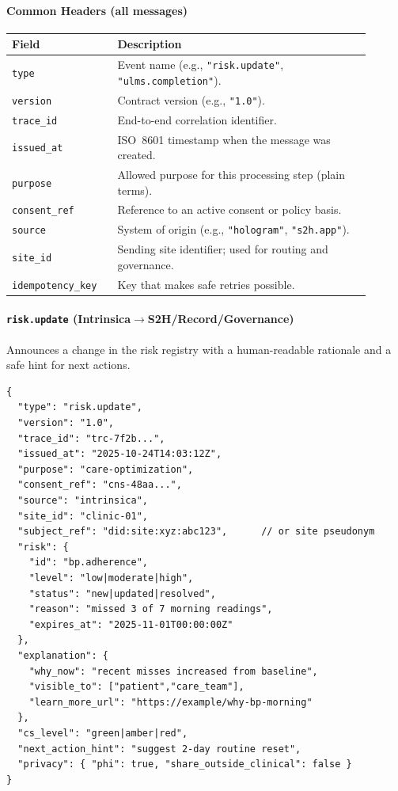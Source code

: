 \documentclass[12pt]{article}
\begin{document}
\paragraph{Common Headers (all messages)}
\begin{longtable}{@{}p{0.26\linewidth}p{0.64\linewidth}@{}}
\toprule
\textbf{Field} & \textbf{Description} \\
\midrule
\endhead
\texttt{type} & Event name (e.g., \texttt{"risk.update"}, \texttt{"ulms.completion"}). \\
\texttt{version} & Contract version (e.g., \texttt{"1.0"}). \\
\texttt{trace\_id} & End-to-end correlation identifier. \\
\texttt{issued\_at} & ISO~8601 timestamp when the message was created. \\
\texttt{purpose} & Allowed purpose for this processing step (plain terms). \\
\texttt{consent\_ref} & Reference to an active consent or policy basis. \\
\texttt{source} & System of origin (e.g., \texttt{"hologram"}, \texttt{"s2h.app"}). \\
\texttt{site\_id} & Sending site identifier; used for routing and governance. \\
\texttt{idempotency\_key} & Key that makes safe retries possible. \\
\bottomrule
\end{longtable}

\paragraph{\texttt{risk.update} (Intrinsica$\rightarrow$S2H/Record/Governance)}
Announces a change in the risk registry with a human-readable rationale and a safe hint for next actions.

\begin{verbatim}
{
  "type": "risk.update",
  "version": "1.0",
  "trace_id": "trc-7f2b...",
  "issued_at": "2025-10-24T14:03:12Z",
  "purpose": "care-optimization",
  "consent_ref": "cns-48aa...",
  "source": "intrinsica",
  "site_id": "clinic-01",
  "subject_ref": "did:site:xyz:abc123",      // or site pseudonym
  "risk": {
    "id": "bp.adherence",
    "level": "low|moderate|high",
    "status": "new|updated|resolved",
    "reason": "missed 3 of 7 morning readings",
    "expires_at": "2025-11-01T00:00:00Z"
  },
  "explanation": {
    "why_now": "recent misses increased from baseline",
    "visible_to": ["patient","care_team"],
    "learn_more_url": "https://example/why-bp-morning"
  },
  "cs_level": "green|amber|red",
  "next_action_hint": "suggest 2-day routine reset",
  "privacy": { "phi": true, "share_outside_clinical": false }
}
\end{verbatim}
\end{document}
